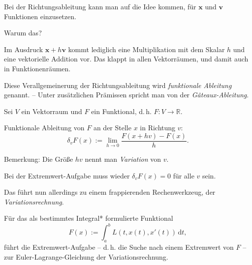 \documentclass{beamer}
\newcommand{\R}{\mathbb R}
\begin{document}
\begin{frame}
Bei der Richtungsableitung kann man auf die Idee kommen, für
$\mathbf x$ und $\mathbf v$ Funktionen einzusetzen.
\pause

\vspace{0.6em}
Warum das?
\pause

\vspace{0.6em}
Im Ausdruck $\mathbf x+h\mathbf v$ kommt lediglich eine
Multiplikation mit dem Skalar $h$ und eine vektorielle Addition vor.
Das klappt in allen Vektorräumen, und damit auch in Funktionenräumen.
\pause

\vspace{0.8em}
Diese Verallgemeinerung der Richtungsableitung wird
\emph{funktionale Ableitung} genannt. -- Unter zusätzlichen
Prämissen spricht man von der \emph{Gâteaux-Ableitung}.
\end{frame}

\begin{frame}
\begin{Definition}
Sei $V$ ein Vektorraum und $F$ ein Funktional, d.\,h. $F\colon V\to\R$.

\vspace{0.6em}
Funktionale Ableitung von $F$ an der Stelle $x$ in Richtung $v$:
\[\delta_v F(x) := \lim_{h\to 0}\frac{F(x+hv)-F(x)}{h}.\]
\end{Definition}\pause

Bemerkung: Die Größe $hv$ nennt man \emph{Variation} von $v$.
\end{frame}

\begin{frame}
Bei der Extremwert-Aufgabe muss wieder $\delta_v F(x)=0$ für alle
$v$ sein.
\pause

\vspace{0.8em}
Das führt nun allerdings zu einem frappierenden Rechenwerkzeug,
der \emph{Variationsrechnung}.
\end{frame}

\begin{frame}
Für das als bestimmtes Integral* formulierte Funktional
\[F(x) := \int_a^b L(t,x(t),x'(t))\,\mathrm dt,\]
führt die Extremwert-Aufgabe -- d.\,h. die Suche nach einem Extremwert
von $F$ -- zur Euler-Lagrange-Gleichung der Variationsrechnung.
\end{frame}
\end{document}
